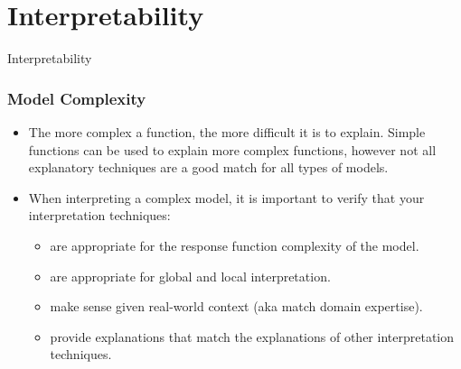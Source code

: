 \section{Interpretability}

\begin{frame}[c]
\Huge{\centerline{Interpretability}}
\end{frame}

\begin{frame}\frametitle{Model Complexity}

	\begin{itemize}
		\item The more complex a function, the more difficult it is to explain. Simple functions can be used to explain more complex functions, however not all explanatory techniques are a good match for all types of models. 
		\bigskip
		\item When interpreting a complex model, it is important to verify that your interpretation techniques:
		\begin{itemize}
			\item are appropriate for the response function complexity of the model.
			\item are appropriate for global and local interpretation.
			\item make sense given real-world context (aka match domain expertise).
			\item provide explanations that match the explanations of other interpretation techniques.
		\end{itemize}
		\end{itemize}
\end{frame}


